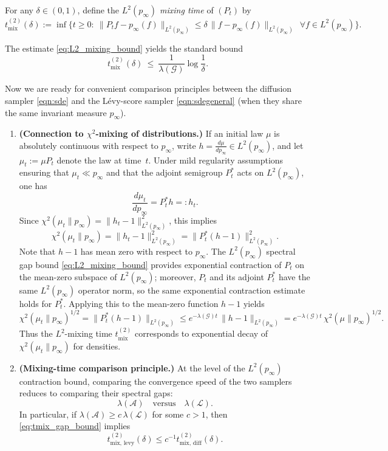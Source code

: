 \begin{definition}
For any $\delta\in(0,1)$, define the \emph{$L^2(p_\infty)$ mixing time} of $(P_t)$ by
\begin{equation}\label{eq:L2_mixing_time}
t_{\mathrm{mix}}^{(2)}(\delta)
:=
\inf\Big\{t\ge 0:\ 
\|P_t f - p_\infty(f)\|_{L^2(p_\infty)}
\le
\delta\,\|f-p_\infty(f)\|_{L^2(p_\infty)}\ \ \forall f\in L^2(p_\infty)\Big\}.
\end{equation}
\end{definition}
The estimate \eqref{eq:L2_mixing_bound} yields the standard bound
\begin{equation}\label{eq:tmix_gap_bound}
t_{\mathrm{mix}}^{(2)}(\delta)\ \le\ \frac{1}{\lambda(\mathcal{G})}\log\frac{1}{\delta}.
\end{equation}

Now we are ready for convenient comparison principles between
the diffusion sampler \eqref{eqn:sde} and the L\'evy-score sampler 
\eqref{eqn:sdegeneral} (when they share the same invariant measure $p_\infty$).
\begin{enumerate}
\item \textbf{(Connection to $\chi^2$-mixing of distributions.)}
If an initial law $\mu$ is absolutely continuous with respect to $p_\infty$, write
\(h = \frac{d\mu}{d p_\infty} \in L^2(p_\infty)\), and let \(\mu_t := \mu P_t\) denote
the law at time~\(t\). Under mild regularity assumptions ensuring that
\(\mu_t \ll p_\infty\) and that the adjoint semigroup \(P_t^\ast\) acts on
\(L^2(p_\infty)\), one has
\[
\frac{d\mu_t}{d p_\infty} = P_t^\ast h =: h_t.
\]
Since \(\chi^2(\mu_t\|p_\infty) = \|h_t - 1\|_{L^2(p_\infty)}^2\), this implies
\[
\chi^2(\mu_t\|p_\infty)
=
\|h_t - 1\|_{L^2(p_\infty)}^2
=
\|P_t^\ast(h-1)\|_{L^2(p_\infty)}^2.
\]
Note that \(h-1\) has mean zero with respect to \(p_\infty\). The $L^2(p_\infty)$
spectral gap bound \eqref{eq:L2_mixing_bound} provides exponential contraction
of \(P_t\) on the mean-zero subspace of \(L^2(p_\infty)\); moreover, \(P_t\) and
its adjoint \(P_t^\ast\) have the same $L^2(p_\infty)$ operator norm, so the
same exponential contraction estimate holds for \(P_t^\ast\). Applying this to
the mean-zero function \(h-1\) yields
\[
\chi^2(\mu_t\|p_\infty)^{1/2}
=
\|P_t^\ast(h-1)\|_{L^2(p_\infty)}
\le
e^{-\lambda(\mathcal{G})t}\,\|h-1\|_{L^2(p_\infty)}
=
e^{-\lambda(\mathcal{G})t}\,\chi^2(\mu\|p_\infty)^{1/2}.
\]
Thus the $L^2$-mixing time \(t_{\mathrm{mix}}^{(2)}\) corresponds to exponential
decay of \(\chi^2(\mu_t\|p_\infty)\) for densities.

\item \textbf{(Mixing-time comparison principle.)}
At the level of the $L^2(p_\infty)$ contraction bound, comparing the convergence speed of the two samplers reduces to
comparing their spectral gaps:
\[
\lambda(\mathcal{A})\quad\text{versus}\quad \lambda(\mathcal{L}).
\]
In particular, if $\lambda(\mathcal{A})\ge c\,\lambda(\mathcal{L})$ for some $c>1$, then \eqref{eq:tmix_gap_bound} implies
\[
t_{\mathrm{mix,\,levy}}^{(2)}(\delta)\le c^{-1}t_{\mathrm{mix,\,diff}}^{(2)}(\delta).
\]
\end{enumerate}

